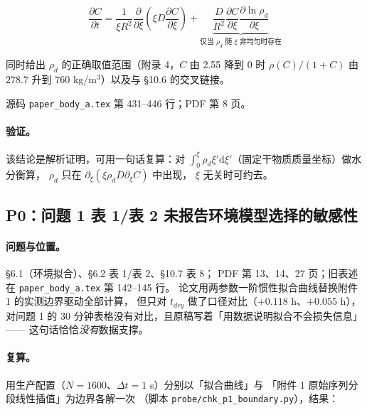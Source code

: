 \documentclass[11pt,a4paper]{ctexart}
\newcommand{\src}[1]{\texttt{#1}}
\newcommand{\loc}[1]{\textcolor{blue!60!black}{#1}}
\begin{document}
\[
\frac{\partial C}{\partial t}=\frac{1}{\xi R^2}\frac{\partial}{\partial \xi}
\left(\xi D\frac{\partial C}{\partial \xi}\right)
+\underbrace{\frac{D}{R^2}\frac{\partial C}{\partial \xi}\frac{\partial\ln\rho_d}{\partial \xi}}_{\text{仅当 }\rho_d\text{ 随 }\xi\text{ 非均匀时存在}}
\]

\noindent 同时给出 $\rho_d$ 的正确取值范围（附录 4，$C$ 由 2.55 降到 0 时
$\rho(C)/(1+C)$ 由 $278.7$ 升到 $760$ kg/m$^3$）以及与 §10.6 的交叉链接。

\loc{源码 \src{paper\_body\_a.tex} 第 431--446 行；PDF 第 8 页}。

\paragraph{验证。}该结论是解析证明，可用一句话复算：对
$\int_0^\xi \rho_d\xi'\mathrm{d}\xi'$（固定干物质质量坐标）做水分衡算，
$\rho_d$ 只在 $\partial_\xi(\xi\rho_dD\partial_\xi C)$ 中出现，
$\xi$ 无关时可约去。

\subsection{P0：问题 1 表 1/表 2 未报告环境模型选择的敏感性}

\paragraph{问题与位置。}\loc{§6.1（环境拟合）、§6.2 表 1/表 2、§10.7 表 8；
PDF 第 13、14、27 页；旧表述在 \src{paper\_body\_a.tex} 第 142--145 行}。
论文用两参数一阶惯性拟合曲线替换附件 1 的实测边界驱动全部计算，
但只对 $t_{dry}$ 做了口径对比（$+0.118$ h、$+0.055$ h），
对问题 1 的 30 分钟表格没有对比，且原稿写着「用数据说明拟合不会损失信息」——
这句话恰恰\emph{没有}数据支撑。

\paragraph{复算。}用生产配置（$N=1600$、$\Delta t=1$ s）分别以「拟合曲线」与
「附件 1 原始序列分段线性插值」为边界各解一次
（脚本 \src{probe/chk\_p1\_boundary.py}），结果：
\end{document}
